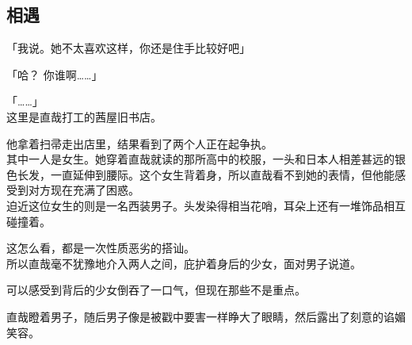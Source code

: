 \subsection{相遇}

「我说。她不太喜欢这样，你还是住手比较好吧」

「哈？ 你谁啊……」

「……」\\

这里是直哉打工的茜屋旧书店。

他拿着扫帚走出店里，结果看到了两个人正在起争执。\\

其中一人是女生。她穿着直哉就读的那所高中的校服，一头和日本人相差甚远的银色长发，一直延伸到腰际。这个女生背着身，所以直哉看不到她的表情，但他能感受到对方现在充满了困惑。\\

迫近这位女生的则是一名西装男子。头发染得相当花哨，耳朵上还有一堆饰品相互碰撞着。

这怎么看，都是一次性质恶劣的搭讪。\\

所以直哉毫不犹豫地介入两人之间，庇护着身后的少女，面对男子说道。

可以感受到背后的少女倒吞了一口气，但现在那些不是重点。

直哉瞪着男子，随后男子像是被戳中要害一样睁大了眼睛，然后露出了刻意的谄媚笑容。\\

